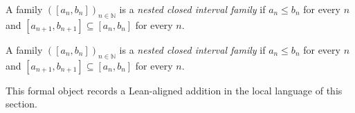 \begin{definition}
\label{def:is-nested-closed-interval-family}
A family $([a_n,b_n])_{n\in\mathbb N}$ is a \emph{nested closed interval family} if $a_n\le b_n$ for every $n$ and $[a_{n+1},b_{n+1}]\subseteq [a_n,b_n]$ for every $n$.
\end{definition}

\begin{remark*}
A family $([a_n,b_n])_{n\in\mathbb N}$ is a \emph{nested closed interval family} if $a_n\le b_n$ for every $n$ and $[a_{n+1},b_{n+1}]\subseteq [a_n,b_n]$ for every $n$.
\end{remark*}

\begin{remark*}[Interpretation]
This formal object records a Lean-aligned addition in the local language of this section.
\end{remark*}

\begin{dependencies}
\NoLocalDependencies
\end{dependencies}
